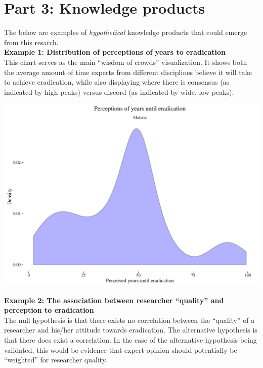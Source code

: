 \documentclass{article}
\begin{document}
\newpage 
\section*{Part 3: Knowledge products}

The below are examples of \emph{hypothetical} knowledge products that could emerge from this resarch. \\

\noindent \textbf{Example 1: Distribution of perceptions of years to eradication} \\
\noindent This chart serves as the main “wisdom of crowds” visualization. It shows both the average amount of time experts from different disciplines believe it will take to achieve eradication, while also displaying where there is consensus (as indicated by high peaks) versus discord (as indicated by wide, low peaks). 


\begin{center}
\includegraphics{chart1.pdf}
\end{center}

\newpage
\noindent \textbf{Example 2: The association between researcher “quality” and perception to eradication} \\
\noindent The null hypothesis is that there exists no correlation between the “quality” of a researcher and his/her attitude towards eradication. The alternative hypothesis is that there does exist a correlation. In the case of the alternative hypothesis being validated, this would be evidence that expert opinion should potentially be “weighted” for researcher quality. 
\end{document}
